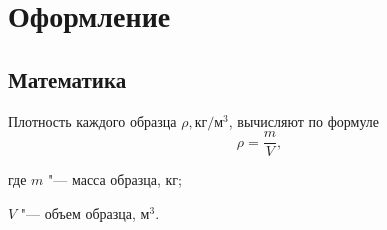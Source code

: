 \section{Оформление}

\subsection{Математика}

Плотность каждого образца $\rho, \text{кг}/\text{м}^3$, вычисляют
по формуле
\begin{equation}
\label{eq:1}
\rho = \frac{m}{V},
\end{equation}
\begin{ESKDexplanation}
\item[где ] $m$ "--- масса образца, кг;
\item $V$ "--- объем образца, $\text{м}^3$.
\end{ESKDexplanation}


